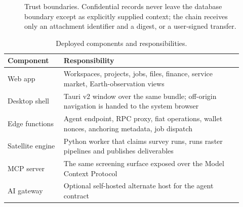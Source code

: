 \documentclass[10pt,a4paper,twocolumn]{article}
\begin{document}
\begin{figure}[t]
\centering
{}
\caption{Trust boundaries. Confidential records never leave the database boundary
except as explicitly supplied context; the chain receives only an attachment
identifier and a digest, or a user-signed transfer.}
\label{fig:arch}
\end{figure}

\begin{table}[t]
\centering
\caption{Deployed components and responsibilities.}
\label{tab:components}
\small
\begin{tabular}{@{}p{0.22\linewidth}p{0.70\linewidth}@{}}
\toprule
Component & Responsibility \\
\midrule
Web app & Workspaces, projects, jobs, files, finance, service market, Earth-observation views \\
Desktop shell & Tauri v2 window over the same bundle; off-origin navigation is handed to the system browser \\
Edge functions & Agent endpoint, RPC proxy, fiat operations, wallet nonces, anchoring metadata, job dispatch \\
Satellite engine & Python worker that claims survey runs, runs raster pipelines and publishes deliverables \\
MCP server & The same screening surface exposed over the Model Context Protocol \\
AI gateway & Optional self-hosted alternate host for the agent contract \\
\bottomrule
\end{tabular}
\end{table}
\end{document}
